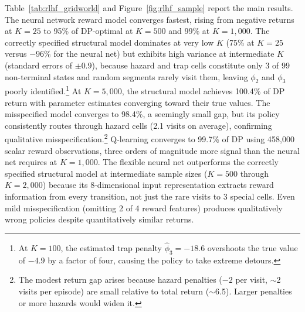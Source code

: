 Table~\ref{tab:rlhf_gridworld} and Figure~\ref{fig:rlhf_sample} report the main results. The neural network reward model converges fastest, rising from negative returns at $K = 25$ to 95\% of DP-optimal at $K = 500$ and 99\% at $K = 1{,}000$. The correctly specified structural model dominates at very low $K$ (75\% at $K = 25$ versus $-96\%$ for the neural net) but exhibits high variance at intermediate $K$ (standard errors of $\pm 0.9$), because hazard and trap cells constitute only 3 of 99 non-terminal states and random segments rarely visit them, leaving $\phi_2$ and $\phi_3$ poorly identified.\footnote{At $K = 100$, the estimated trap penalty $\hat{\phi}_3 = -18.6$ overshoots the true value of $-4.9$ by a factor of four, causing the policy to take extreme detours.} At $K = 5{,}000$, the structural model achieves 100.4\% of DP return with parameter estimates converging toward their true values. The misspecified model converges to 98.4\%, a seemingly small gap, but its policy consistently routes through hazard cells (2.1 visits on average), confirming qualitative misspecification.\footnote{The modest return gap arises because hazard penalties ($-2$ per visit, $\sim$2 visits per episode) are small relative to total return ($\sim$6.5). Larger penalties or more hazards would widen it.} Q-learning converges to 99.7\% of DP using 458,000 scalar reward observations, three orders of magnitude more signal than the neural net requires at $K = 1{,}000$. The flexible neural net outperforms the correctly specified structural model at intermediate sample sizes ($K = 500$ through $K = 2{,}000$) because its 8-dimensional input representation extracts reward information from every transition, not just the rare visits to 3 special cells. Even mild misspecification (omitting 2 of 4 reward features) produces qualitatively wrong policies despite quantitatively similar returns.

\begin{table}[htbp]
\centering
\caption{Diagnostics at $K = 5{,}000$ (single seed). Policy agreement measures the fraction of non-goal states where each method's greedy policy matches $\pi^*$. Reward MAE is the mean absolute error of the estimated expected reward table against the true table. $V^\pi$ correlation is the Pearson correlation between the true value of the learned policy (evaluated under the true reward) and $V^*$. Hazard visits counts states where the deterministic policy routes into hazard or trap cells.}
\label{tab:rlhf_diagnostics}

\end{table}

